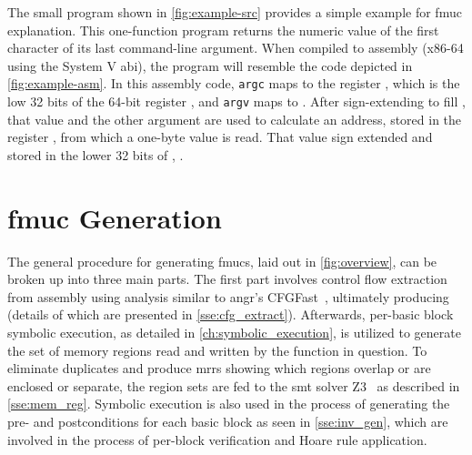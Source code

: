 The small program shown in \cref{fig:example-src} provides a simple example
for \ac{fmuc} explanation. This one-function program
returns the numeric value of the first character of its last command-line argument.
When compiled to assembly (x86-64 using the System V \ac{abi}),
the program will resemble the code depicted in \cref{fig:example-asm}.
In this assembly code,
\lstinline|argc| maps to the register ,
which is the low 32 bits of the 64-bit register ,
and \lstinline|argv| maps to .
After sign-extending  to fill ,
that value and the other argument are used to calculate
an address, stored in the register ,
from which a one-byte value is read.
That value sign extended and stored in the lower 32 bits of ,
.

\section{\acs*{fmuc} Generation}\label{se:fmuc_gen}
\begin{figure*}
  \centering
  \caption{FMUC Overview}\label{fig:overview}
\end{figure*}

The general procedure for generating \acp{fmuc}, laid out in \cref{fig:overview},
can be broken up into three main parts.
The first part involves control flow extraction from assembly using  analysis
similar to angr's CFGFast~\citep{shoshitaishvili2016state},
ultimately producing  (details of which are presented
in \cref{sse:cfg_extract}).
Afterwards, per-basic block symbolic execution,
as detailed in \cref{ch:symbolic_execution},
is utilized to generate the set of memory regions
read and written by the function in question.
To eliminate duplicates and produce \acp{mrr}
showing which regions overlap or are enclosed or separate,
the region sets are fed to the \ac{smt} solver Z3~\citep{de2008z3}
as described in \cref{sse:mem_reg}.
Symbolic execution is also used in the process of generating
the pre- and postconditions for each basic block as seen in \cref{sse:inv_gen},
which are involved in the process of per-block verification
and Hoare rule application.

